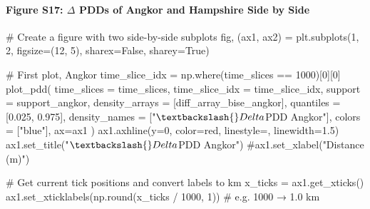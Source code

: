 \documentclass[
  11pt,
  letterpaper,
  DIV=11,
  numbers=noendperiod]{scrartcl}
\let\oldparagraph\paragraph
\renewcommand{\paragraph}[1]{\oldparagraph{#1}\mbox{}}
\newenvironment{Shaded}{\begin{snugshade}}{\end{snugshade}}
\newcommand{\BuiltInTok}[1]{\textcolor[rgb]{0.00,0.23,0.31}{#1}}
\newcommand{\CommentTok}[1]{\textcolor[rgb]{0.37,0.37,0.37}{#1}}
\newcommand{\DecValTok}[1]{\textcolor[rgb]{0.68,0.00,0.00}{#1}}
\newcommand{\FloatTok}[1]{\textcolor[rgb]{0.68,0.00,0.00}{#1}}
\newcommand{\NormalTok}[1]{\textcolor[rgb]{0.00,0.23,0.31}{#1}}
\newcommand{\OperatorTok}[1]{\textcolor[rgb]{0.37,0.37,0.37}{#1}}
\newcommand{\StringTok}[1]{\textcolor[rgb]{0.13,0.47,0.30}{#1}}
\newcommand{\VariableTok}[1]{\textcolor[rgb]{0.07,0.07,0.07}{#1}}
\begin{document}
\paragraph{\texorpdfstring{Figure S17: \(\Delta\) PDDs of Angkor and
Hampshire Side by
Side}{Figure S17: \textbackslash Delta PDDs of Angkor and Hampshire Side by Side}}\label{figure-s17-delta-pdds-of-angkor-and-hampshire-side-by-side}

\begin{Shaded}
\begin{Highlighting}[]
\CommentTok{\# Create a figure with two side{-}by{-}side subplots}
\NormalTok{fig, (ax1, ax2) }\OperatorTok{=}\NormalTok{ plt.subplots(}\DecValTok{1}\NormalTok{, }\DecValTok{2}\NormalTok{, figsize}\OperatorTok{=}\NormalTok{(}\DecValTok{12}\NormalTok{, }\DecValTok{5}\NormalTok{), sharex}\OperatorTok{=}\VariableTok{False}\NormalTok{, sharey}\OperatorTok{=}\VariableTok{True}\NormalTok{)}

\CommentTok{\# First plot, Angkor}
\NormalTok{time\_slice\_idx }\OperatorTok{=}\NormalTok{ np.where(time\_slices }\OperatorTok{==} \DecValTok{1000}\NormalTok{)[}\DecValTok{0}\NormalTok{][}\DecValTok{0}\NormalTok{]}
\NormalTok{plot\_pdd(}
\NormalTok{    time\_slices }\OperatorTok{=}\NormalTok{ time\_slices,}
\NormalTok{    time\_slice\_idx }\OperatorTok{=}\NormalTok{ time\_slice\_idx,}
\NormalTok{    support }\OperatorTok{=}\NormalTok{ support\_angkor,}
\NormalTok{    density\_arrays }\OperatorTok{=}\NormalTok{ [diff\_array\_bise\_angkor],}
\NormalTok{    quantiles }\OperatorTok{=}\NormalTok{ [}\FloatTok{0.025}\NormalTok{, }\FloatTok{0.975}\NormalTok{],}
\NormalTok{    density\_names }\OperatorTok{=}\NormalTok{ [}\StringTok{"$\textbackslash{}Delta$PDD Angkor"}\NormalTok{],}
\NormalTok{    colors }\OperatorTok{=}\NormalTok{ [}\StringTok{"blue"}\NormalTok{],}
\NormalTok{    ax}\OperatorTok{=}\NormalTok{ax1}
\NormalTok{)}
\NormalTok{ax1.axhline(y}\OperatorTok{=}\DecValTok{0}\NormalTok{, color}\OperatorTok{=}\StringTok{\textquotesingle{}red\textquotesingle{}}\NormalTok{, linestyle}\OperatorTok{=}\StringTok{\textquotesingle{}{-}{-}\textquotesingle{}}\NormalTok{, linewidth}\OperatorTok{=}\FloatTok{1.5}\NormalTok{)}
\NormalTok{ax1.set\_title(}\StringTok{"$\textbackslash{}Delta$PDD Angkor"}\NormalTok{)}
\CommentTok{\#ax1.set\_xlabel("Distance (m)")}

\CommentTok{\# Get current tick positions and convert labels to km}
\NormalTok{x\_ticks }\OperatorTok{=}\NormalTok{ ax1.get\_xticks()}
\NormalTok{ax1.set\_xticklabels(np.}\BuiltInTok{round}\NormalTok{(x\_ticks }\OperatorTok{/} \DecValTok{1000}\NormalTok{, }\DecValTok{1}\NormalTok{))  }\CommentTok{\# e.g. 1000 → 1.0 km}


\end{Highlighting}
\end{Shaded}
\end{document}
